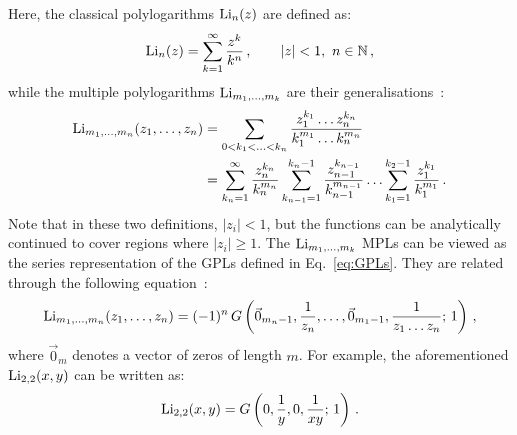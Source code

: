 \documentclass[main.tex]{subfiles}
\begin{document}
Here, the classical polylogarithms $\text{Li}_n(z)$ are defined as:
\begin{equation} \label{eq:Lidefinition}
    \text{Li}_n(z) = \sum_{k=1}^\infty \frac{z^k}{k^n}\,, \qquad |z|<1,\,\, n \in \mathbb{N}\,,
\end{equation}
while the multiple polylogarithms $\text{Li}_{m_1, \ldots, m_k}$ are their generalisations~\cite{2011arXiv1105.2076G, Duhr:2019tlz}:
\begin{subequations}
\begin{align} \label{eq:multiLidefinition}
    \text{Li}_{m_1, \ldots, m_n}(z_1, \ldots, z_n) &= \sum_{0<k_1<\ldots<k_n} \frac{z_1^{k_1} \ldots z_n^{k_n}}{k_1^{m_1} \ldots k_n^{m_n}} \\
    &= \sum_{k_n=1}^\infty \frac{z_n^{k_n}}{k_n^{m_n}} \sum_{k_{n-1}=1}^{k_n-1} \frac{z_{n-1}^{k_{n-1}}}{k_{n-1}^{m_{n-1}}}\ldots \sum_{k_1=1}^{k_2-1} \frac{z_1^{k_1}}{k_1^{m_1}}\,. \label{eq:multiLidefinition2}
\end{align}
\end{subequations}
Note that in these two definitions, $|z_i|<1$, but the functions can be analytically continued to cover regions where $|z_i| \ge 1$. The $\text{Li}_{m_1, \ldots, m_k}$ MPLs can be viewed as the series representation of the GPLs defined in Eq.~\ref{eq:GPLs}. They are related through the following equation~\cite{Duhr:2011zq}:
\begin{equation} \label{eq:LiToG}
    \text{Li}_{m_1, \ldots, m_n}(z_1, \ldots, z_n) = (-1)^n\,G\left(\vec{0}_{m_n-1}, \frac{1}{z_n}, \ldots, \vec{0}_{m_1-1}, \frac{1}{z_1\ldots z_n}; \,1 \right)\,,
\end{equation}
where $\vec{0}_m$ denotes a vector of zeros of length $m$. For example, the aforementioned $\text{Li}_{2,2}(x, y)$ can be written as:%
\begin{equation}
     \text{Li}_{2,2}(x, y) = G\left(0, \frac{1}{y}, 0, \frac{1}{xy};\,1 \right)\,.
\end{equation}
\end{document}
